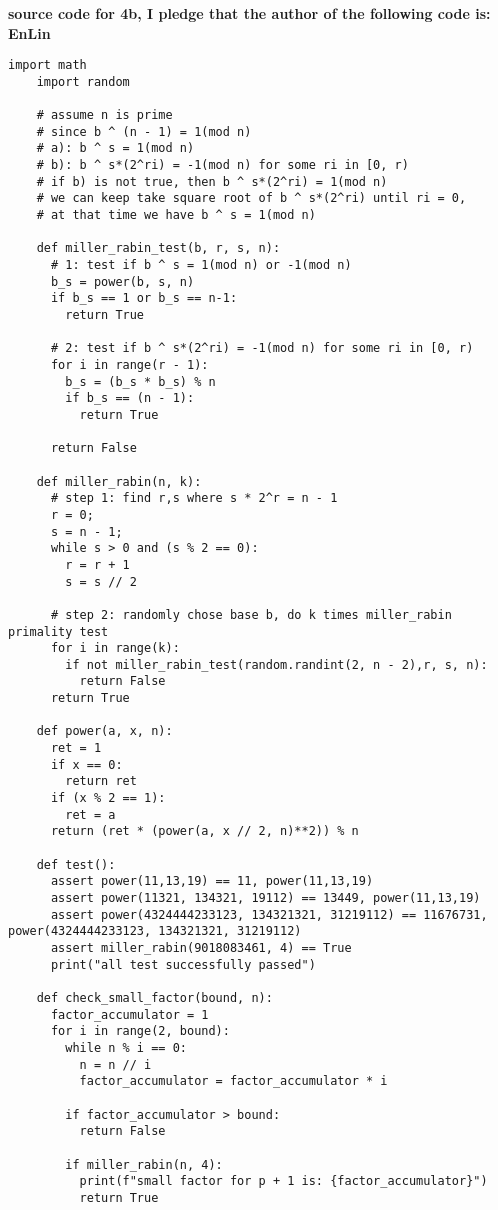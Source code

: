 \documentclass[12pt,letterpaper]{article}
\begin{document}
  \textbf{source code for 4b, I pledge that the author of the following code is: EnLin}
 \\
  \begin{lstlisting}[style = Python]
    import math
    import random
    
    # assume n is prime
    # since b ^ (n - 1) = 1(mod n)
    # a): b ^ s = 1(mod n)
    # b): b ^ s*(2^ri) = -1(mod n) for some ri in [0, r)
    # if b) is not true, then b ^ s*(2^ri) = 1(mod n) 
    # we can keep take square root of b ^ s*(2^ri) until ri = 0,
    # at that time we have b ^ s = 1(mod n)
    
    def miller_rabin_test(b, r, s, n):
      # 1: test if b ^ s = 1(mod n) or -1(mod n)
      b_s = power(b, s, n)
      if b_s == 1 or b_s == n-1:
        return True
    
      # 2: test if b ^ s*(2^ri) = -1(mod n) for some ri in [0, r)
      for i in range(r - 1):
        b_s = (b_s * b_s) % n
        if b_s == (n - 1):
          return True
    
      return False
    
    def miller_rabin(n, k):
      # step 1: find r,s where s * 2^r = n - 1
      r = 0; 
      s = n - 1;
      while s > 0 and (s % 2 == 0):
        r = r + 1
        s = s // 2
    
      # step 2: randomly chose base b, do k times miller_rabin primality test
      for i in range(k):
        if not miller_rabin_test(random.randint(2, n - 2),r, s, n):
          return False
      return True
    
    def power(a, x, n):
      ret = 1
      if x == 0:
        return ret
      if (x % 2 == 1):
        ret = a
      return (ret * (power(a, x // 2, n)**2)) % n
    
    def test():
      assert power(11,13,19) == 11, power(11,13,19)
      assert power(11321, 134321, 19112) == 13449, power(11,13,19)
      assert power(4324444233123, 134321321, 31219112) == 11676731, power(4324444233123, 134321321, 31219112)
      assert miller_rabin(9018083461, 4) == True
      print("all test successfully passed")
    
    def check_small_factor(bound, n):
      factor_accumulator = 1
      for i in range(2, bound):
        while n % i == 0:
          n = n // i
          factor_accumulator = factor_accumulator * i
    
        if factor_accumulator > bound:
          return False
    
        if miller_rabin(n, 4):
          print(f"small factor for p + 1 is: {factor_accumulator}")
          return True
    

\end{lstlisting}
\end{document}
